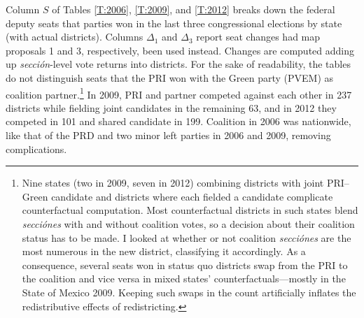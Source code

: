 \documentclass[letter,12pt]{article}
\begin{document}
Column $S$ of Tables \ref{T:2006}, \ref{T:2009}, and \ref{T:2012} breaks down the federal deputy seats that parties won in the last three congressional elections by state (with actual districts). Columns $\Delta_1$ and $\Delta_3$ report seat changes had map proposals 1 and 3, respectively, been used instead. Changes are computed adding up \emph{secci\'on}-level vote returns into districts. For the sake of readability, the tables do not distinguish seats that the PRI won with the Green party (PVEM) as coalition partner.\footnote{Nine states (two in 2009, seven in 2012) combining districts with joint PRI--Green candidate and districts where each fielded a candidate complicate counterfactual computation. Most counterfactual districts in such states blend \emph{secci\'ones} with and without coalition votes, so a decision about their coalition status has to be made. I looked at whether or not coalition \emph{secci\'ones} are the most numerous in the new district, classifying it accordingly. As a consequence, several seats won in status quo districts swap from the PRI to the coalition and vice versa in mixed states' counterfactuals---mostly in the State of Mexico 2009. Keeping such swaps in the count artificially inflates the redistributive effects of redistricting.} In 2009, PRI and partner competed against each other in 237 districts while fielding joint candidates in the remaining 63, and in 2012 they competed in 101 and shared candidate in 199. Coalition in 2006 was nationwide, like that of the PRD and two minor left parties in 2006 and 2009, removing complications. 

\end{document}
